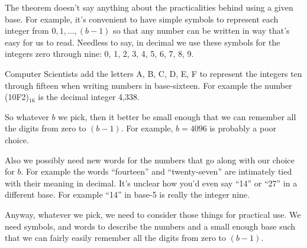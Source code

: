 \documentclass{article}
\newcommand{\otherbeta}{{\letterbeta B}}
\begin{document}
The theorem doesn't say anything about the practicalities behind
using a given base. For example, it's convenient to have 
simple symbols to represent each integer from \(0, 1, \dots{}, (b-1)\) so
that any number can be written in way that's easy for us to read. Needless to say,
in decimal we use these symbols for the integers zero through nine: 0, 1, 2, 3, 4, 5, 6, 7, 8, 9.

Computer Scientists add the letters A, B, C, D, E, F to represent the integers ten through fifteen
when writing numbers in base-sixteen. For example the number (10F2)\(_{16}\) is the decimal integer
4,338.

So whatever \(b\) we pick, then it better be small enough that we can remember all the digits
from zero to \((b-1)\). For example, \(b = 4096\) is probably a poor choice.

Also we possibly need new words for the numbers that go along with our choice for \(b\).
For example the words ``fourteen'' and ``twenty-seven'' are intimately tied with their meaning in decimal.
It's unclear how you'd even say ``14'' or ``27'' in a different base. For example ``14'' in base-5 is really the
integer nine.

Anyway, whatever we pick, we need to consider those things for practical use. We need symbols, and words to
describe the numbers and a small enough base such that we can fairly easily remember all the digits 
from zero to \((b-1)\).

\end{document}
